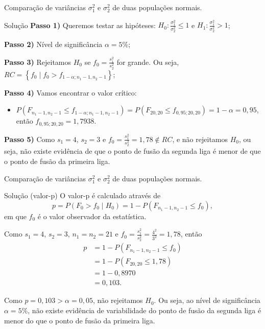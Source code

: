 \documentclass[9pt]{beamer}
\begin{document}
\begin{frame}{Comparação de variâncias $\sigma_1^2$ e $\sigma_2^2$ de duas populações normais.}

\begin{block}{Solução}
	\textbf{Passo 1)} Queremos testar as hipóteses: $H_0: \frac{\sigma_1^2}{\sigma_2^2} \leq 1$ e $H_1: \frac{\sigma_1^2}{\sigma_2^2}  > 1$;
	
	\textbf{Passo 2)} Nível de significância $\alpha=5\%$;
	
	\textbf{Passo 3)} Rejeitamos $H_0$ se $f_0 = \frac{s_1^2}{s_2^2}$ for grande. Ou seja, $RC=\left\{ f_0 \mid f_0 > f_{1-\alpha; n_1-1, n_2-1} \right\}$;
	
	\textbf{Passo 4)} Vamos encontrar o valor crítico:
	\begin{itemize}
		\item $P\left( F_{n_1-1, n_2-1} \leq f_{1-\alpha; n_1-1, n_2-1} \right) = P\left( F_{20, 20} \leq f_{0,95; 20, 20} \right) = 1-\alpha=0,95$, então $f_{0,95; 20, 20} = 1,7938$.
	\end{itemize}

	\textbf{Passo 5)} Como $s_1 = 4$, $s_2=3$ e $f_0 = \frac{s_1^2}{s_2^2} = 1,78 \not\in RC$, e não rejeitamos $H_0$, ou seja, não existe evidência de que o ponto de fusão da segunda liga é menor de que o ponto de fusão da primeira liga.
\end{block}

\end{frame}

\begin{frame}{Comparação de variâncias $\sigma_1^2$ e $\sigma_2^2$ de duas populações normais.}

\begin{block}{Solução (valor-p)}
	O valor-p é calculado através de 
	$$p=P\left( F_0 > f_0 \mid H_0 \right) =1- P\left( F_{n_1-1, n_2-1} \leq f_0  \right),$$
	em que $f_0$ é o valor observador da estatística.
	
	Como $s_1 = 4$, $s_2 = 3$, $n_1=n_2=21$ e $f_0 = \frac{s_1^2}{s_2^2}=\frac{4^2}{3^2} = 1,78$, então
	\begin{align*}
		p &= 1 - P \left( F_{n_1-1, n_2-1} \leq f_0 \right)\\
		&=1- P \left( F_{20, 20} \leq 1,78 \right)\\
		&= 1 - 0,8970\\
		&= 0,103.
	\end{align*}
	
	Como $p=0,103 > \alpha = 0,05$, não rejeitamos $H_0$. Ou seja, ao nível de significância $\alpha=5\%$, não existe evidência de variabilidade do ponto de fusão da segunda liga é menor do que o ponto de fusão da primeira liga.
\end{block}

\end{frame}
\end{document}
